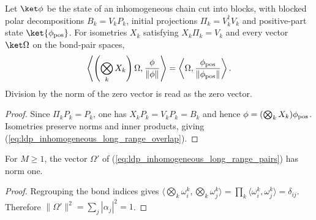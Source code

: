 \begin{lemma}
    \label{lem:ldp_inhomogeneous_long_range_overlap}
    \leanok
    Let $\ket\phi$ be the state of an inhomogeneous chain cut into blocks,
    with blocked polar decompositions $B_k=V_kP_k$, initial projections
    $\Pi_k=V_k^\dagger V_k$ and positive-part state $\ket{\phi_{\rm pos}}$.
    For isometries $X_k$ satisfying $X_k\Pi_k=V_k$ and every vector $\ket\Omega$
    on the bond-pair spaces,
    \begin{align}
        \left\langle\left(\bigotimes_kX_k\right)\Omega,
        \frac{\phi}{\|\phi\|}\right\rangle
        =\left\langle\Omega,
        \frac{\phi_{\rm pos}}{\|\phi_{\rm pos}\|}\right\rangle.
        \label{eq:ldp_inhomogeneous_long_range_overlap}
    \end{align}
    Division by the norm of the zero vector is read as the zero vector.
\end{lemma}
\begin{proof}
    \leanok
    Since $\Pi_kP_k=P_k$, one has $X_kP_k=V_kP_k=B_k$ and hence
    $\phi=(\bigotimes_kX_k)\phi_{\rm pos}$. Isometries preserve norms and
    inner products, giving (\ref{eq:ldp_inhomogeneous_long_range_overlap}).
\end{proof}

\begin{lemma}
    \label{lem:ldp_inhomogeneous_long_range_norm}
    \leanok
    For $M\ge1$, the vector $\Omega'$ of
    (\ref{eq:ldp_inhomogeneous_long_range_pairs}) has norm one.
\end{lemma}
\begin{proof}
    \leanok
    Regrouping the bond indices gives
    $\langle\bigotimes_k\omega_i^k,\bigotimes_k\omega_j^k\rangle
        =\prod_k\langle\omega_i^k,\omega_j^k\rangle=\delta_{ij}$.
    Therefore $\|\Omega'\|^2=\sum_j|\alpha_j|^2=1$.
\end{proof}

